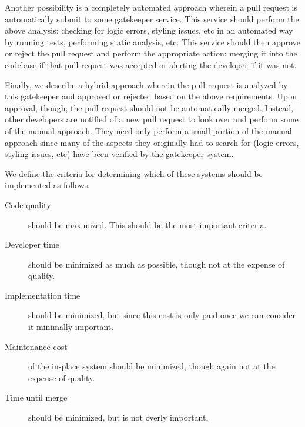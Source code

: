 \documentclass[12pt]{article}
\begin{document}
Another possibility is a completely automated approach wherein a pull request is automatically submit to some gatekeeper service. This service should perform the above analysis: checking for logic errors, styling issues, etc in an automated way by running tests, performing static analysis, etc. This service should then approve or reject the pull request and perform the appropriate action: merging it into the codebase if that pull request was accepted or alerting the developer if it was not.

Finally, we describe a hybrid approach wherein the pull request is analyzed by this gatekeeper and approved or rejected based on the above requirements. Upon approval, though, the pull request should not be automatically merged. Instead, other developers are notified of a new pull request to look over and perform some of the manual approach. They need only perform a small portion of the manual approach since many of the aspects they originally had to search for (logic errors, styling issues, etc) have been verified by the gatekeeper system.

We define the criteria for determining which of these systems should be implemented as follows:
\begin{description}
\item[Code quality] should be maximized. This should be the most important criteria.
\item[Developer time] should be minimized as much as possible, though not at the expense of quality.
\item[Implementation time] should be minimized, but since this cost is only paid once we can consider it minimally important.
\item[Maintenance cost] of the in-place system should be minimized, though again not at the expense of quality.
\item[Time until merge] should be minimized, but is not overly important.
\end{description}
\end{document}
